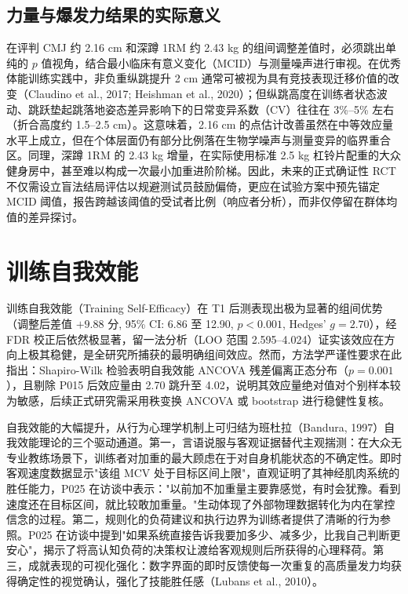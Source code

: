 \documentclass[UTF8,zihao=-4,twoside,openany]{ctexbook}
\begin{document}
\subsection{力量与爆发力结果的实际意义}
在评判 CMJ 约 2.16 cm 和深蹲 1RM 约 2.43 kg 的组间调整差值时，必须跳出单纯的 $p$ 值视角，结合最小临床有意义变化（MCID）与测量噪声进行审视。在优秀体能训练实践中，非负重纵跳提升 2 cm 通常可被视为具有竞技表现迁移价值的改变（Claudino et al., 2017; Heishman et al., 2020）；但纵跳高度在训练者状态波动、跳跃垫起跳落地姿态差异影响下的日常变异系数（CV）往往在 3\%--5\% 左右（折合高度约 1.5--2.5 cm）。这意味着，2.16 cm 的点估计改善虽然在中等效应量水平上成立，但在个体层面仍有部分比例落在生物学噪声与测量变异的临界重合区。同理，深蹲 1RM 的 2.43 kg 增量，在实际使用标准 2.5 kg 杠铃片配重的大众健身房中，甚至难以构成一次最小加重进阶阶梯。因此，未来的正式确证性 RCT 不仅需设立盲法结局评估以规避测试员鼓励偏倚，更应在试验方案中预先锚定 MCID 阈值，报告跨越该阈值的受试者比例（响应者分析），而非仅停留在群体均值的差异探讨。

\section{训练自我效能}
训练自我效能（Training Self-Efficacy）在 T1 后测表现出极为显著的组间优势（调整后差值 $+9.88$ 分, 95\% CI: 6.86 至 12.90, $p<0.001$, Hedges' $g=2.70$），经 FDR 校正后依然极显著，留一法分析（LOO 范围 2.595--4.024）证实该效应在方向上极其稳健，是全研究所捕获的最明确组间效应。然而，方法学严谨性要求在此指出：Shapiro-Wilk 检验表明自我效能 ANCOVA 残差偏离正态分布（$p=0.001$），且剔除 P015 后效应量由 2.70 跳升至 4.02，说明其效应量绝对值对个别样本较为敏感，后续正式研究需采用秩变换 ANCOVA 或 bootstrap 进行稳健性复核。

自我效能的大幅提升，从行为心理学机制上可归结为班杜拉（Bandura, 1997）自我效能理论的三个驱动通道。第一，言语说服与客观证据替代主观揣测：在大众无专业教练场景下，训练者对加重的最大顾虑在于对自身机能状态的不确定性。即时客观速度数据显示"该组 MCV 处于目标区间上限"，直观证明了其神经肌肉系统的胜任能力，P025 在访谈中表示："以前加不加重量主要靠感觉，有时会犹豫。看到速度还在目标区间，就比较敢加重量。"生动体现了外部物理数据转化为内在掌控信念的过程。第二，规则化的负荷建议和执行边界为训练者提供了清晰的行为参照。P025 在访谈中提到"如果系统直接告诉我要加多少、减多少，比我自己判断更安心"，揭示了将高认知负荷的决策权让渡给客观规则后所获得的心理释荷。第三，成就表现的可视化强化：数字界面的即时反馈使每一次重复的高质量发力均获得确定性的视觉确认，强化了技能胜任感（Lubans et al., 2010）。
\end{document}
